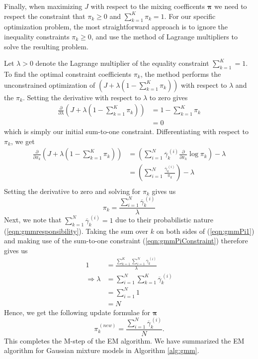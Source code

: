 \documentclass[final,3p,times,twocolumn]{elsarticle}
\let\bs\boldsymbol
\let\ol\overline
\begin{document}
Finally, when maximizing $J$ with respect to the mixing coefficents $\bs\pi$ we need to respect the constraint that $\pi_k \geq 0$ and $\sum_{k=1}^K \pi_k = 1$.
For our specific optimization problem, the most straightforward approach is to ignore the inequality constraints $\pi_k\geq 0$, and use the method of Lagrange multipliers to solve the resulting problem. 

Let $\lambda > 0$ denote the Lagrange multiplier of the equality constraint $\sum_{k=1}^K=1$.
To find the optimal constraint coefficients $\pi_k$, the method performs the unconstrained optimization of $\left(J + \lambda(1-\sum_{k=1}^K \pi_k)\right)$ with respect to $\lambda$ and the $\pi_k$.
Setting the derivative with respect to $\lambda$ to zero gives
\begin{equation}
\begin{split}
\label{eqn:gmmPiConstraint}
\frac{\partial}{\partial \lambda}\left(J + \lambda(1 - \sum_{k=1}^K \pi_k)\right) &= 1 - \sum_{k=1}^K \pi_k\\
&= 0
\end{split}
\end{equation}
which is simply our initial sum-to-one constraint.
Differentiating with respect to $\pi_k$, we get
\begin{equation}
\begin{split}
\frac{\partial}{\partial \pi_k}\left(J + \lambda(1 - \sum_{k=1}^K \pi_k)\right) &= \left(\sum_{i=1}^N\ol\gamma_k^{\,(i)} \frac{\partial}{\partial \pi_k} \log \pi_k\right) - \lambda\\
&= \left(\sum_{i=1}^N \frac{\ol\gamma_k^{\,(i)}}{\pi_k}\right) - \lambda \\
\end{split}
\end{equation}
Setting the derivative to zero and solving for $\pi_k$ gives us
\begin{equation}
\label{eqn:gmmPi1}
\pi_k = \frac{\sum_{i=1}^N\ol\gamma_k^{\,(i)}}{\lambda}
\end{equation}
Next, we note that $\sum_{k=1}^N \ol\gamma_k^{\,(i)} = 1$ due to their probabilistic nature (\ref{eqn:gmmresponsibility}).
Taking the sum over $k$ on both sides of (\ref{eqn:gmmPi1}) and making use of the sum-to-one constraint (\ref{eqn:gmmPiConstraint}) therefore gives us
\begin{equation}
\label{eqn:gmmPi2}
\begin{split}
1 &= \frac{\sum_{k=1}^K \sum_{i=1}^N \ol\gamma_k^{\,(i)}}{\lambda}\\
\Rightarrow \lambda &= \sum_{i=1}^N \sum_{k=1}^K \ol\gamma_k^{\,(i)}\\
&= \sum_{i=1}^N 1 \\
&= N
\end{split}
\end{equation}
Hence, we get the following update formulae for $\bs\pi$
\begin{equation}
\label{eqn:gmmPi}
\pi_k^{\,(new)} = \frac{\sum_{i=1}^N \ol\gamma_k^{\,(i)}}{N}.
\end{equation}
This completes the M-step of the EM algorithm.
We have summarized the EM algorithm for Gaussian mixture models in Algorithm \ref{alg:gmm}.
\end{document}
